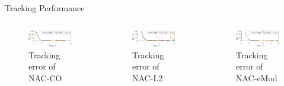 \documentclass[8pt, aspectratio=169]{beamer}
\begin{document}
\begin{frame}{\insertsubsectionhead}{Tracking Performance}

  \begin{columns}


      \begin{figure}
        \includegraphics[width=0.99\textwidth]{figures/ECC/fig5.eps}
        \caption{Tracking error of NAC-CO}
      \end{figure}
    

      \begin{figure}      
        \includegraphics[width=0.99\textwidth]{figures/ECC/fig6.eps}
        \caption{Tracking error of NAC-L2}
      \end{figure}
      

      \begin{figure}
        \includegraphics[width=0.99\textwidth]{figures/ECC/fig7.eps}
        \caption{Tracking error of NAC-eMod}
      \end{figure}


\end{columns}
\end{frame}
\end{document}

